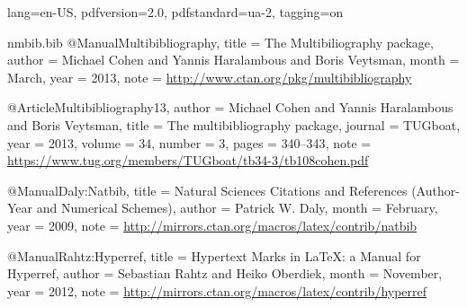 \ifdefined\Uchar\RequirePackage{luatagging}\fi
\DocumentMetadata
  {
    lang=en-US,
    pdfversion=2.0,
    pdfstandard=ua-2,
    tagging=on
  }
\begin{filecontents}[noheader]{nmbib.bib}
@Manual{Multibibliography,
  title = 	 {The {M}ultibiliography package},
  author =	 {Michael Cohen and Yannis Haralambous and Boris Veytsman},
  month =	 {March},
  year =	 2013,
  note =	 {\url{http://www.ctan.org/pkg/multibibliography}}
}

@Article{Multibibliography13,
  author = 	 {Michael Cohen and Yannis Haralambous and Boris Veytsman},
  title = 	 {The multibibliography package},
  journal = 	 {TUGboat},
  year = 	 2013,
  volume =	 34,
  number =	 3,
  pages =	 {340--343},
  note =	 {\url{https://www.tug.org/members/TUGboat/tb34-3/tb108cohen.pdf}}
}

@Manual{Daly:Natbib,
  title = 	 {Natural Sciences Citations and References
                  (Author-Year and Numerical Schemes)},
  author =	 {Patrick W. Daly},
  month =	 {February},
  year =	 2009,
  note =	 {\url{http://mirrors.ctan.org/macros/latex/contrib/natbib}}
}

@Manual{Rahtz:Hyperref,
  title = 	 {Hypertext Marks in \LaTeX: a Manual for Hyperref},
  author =	 {Sebastian Rahtz and Heiko Oberdiek},
  month =	 {November},
  year =	 2012,
  note =	 {\url{http://mirrors.ctan.org/macros/latex/contrib/hyperref}}
}
\end{filecontents}
